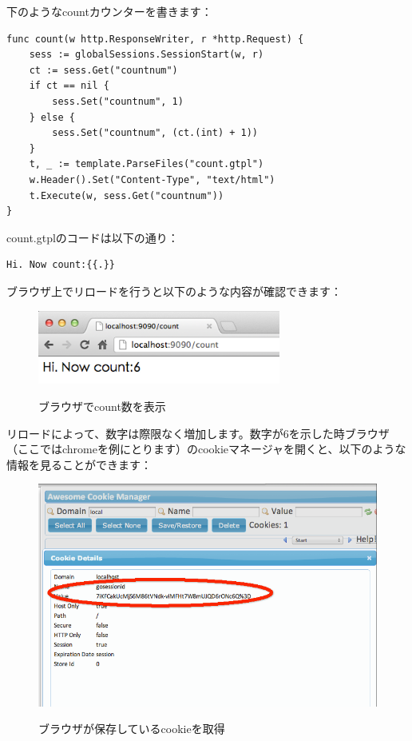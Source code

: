 下のようなcountカウンターを書きます：


\begin{lstlisting}[numbers=none]
func count(w http.ResponseWriter, r *http.Request) {
    sess := globalSessions.SessionStart(w, r)
    ct := sess.Get("countnum")
    if ct == nil {
        sess.Set("countnum", 1)
    } else {
        sess.Set("countnum", (ct.(int) + 1))
    }
    t, _ := template.ParseFiles("count.gtpl")
    w.Header().Set("Content-Type", "text/html")
    t.Execute(w, sess.Get("countnum"))
}
\end{lstlisting}

count.gtplのコードは以下の通り：

\begin{lstlisting}[numbers=none]
Hi. Now count:{{.}}
\end{lstlisting}

ブラウザ上でリロードを行うと以下のような内容が確認できます：

\begin{figure}[H]
  \includegraphics[width=8cm]{6.4.hijack.png}
   \label{図6.4}
   \caption{ブラウザでcount数を表示}
\end{figure}

リロードによって、数字は際限なく増加します。数字が6を示した時ブラウザ（ここではchromeを例にとります）のcookieマネージャを開くと、以下のような情報を見ることができます：

\begin{figure}[H]
  \includegraphics[width=14cm]{6.4.cookie.png}
   \label{図6.5}
   \caption{ブラウザが保存しているcookieを取得}
\end{figure}


